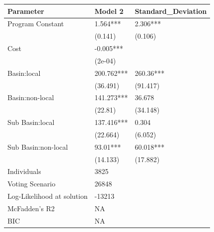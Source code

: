 \begin{table}[ht]
\centering
\begin{tabular}{lll}
  \hline
Parameter & Model 2 & Standard\_Deviation \\ 
  \hline
Program Constant & 1.564*** & 2.306*** \\ 
   & (0.141) & (0.106) \\ 
  Cost & -0.005*** &  \\ 
   & (2e-04) &  \\ 
  Basin:local & 200.762*** & 260.36*** \\ 
   & (36.491) & (91.417) \\ 
  Basin:non-local & 141.273*** & 36.678 \\ 
   & (22.81) & (34.148) \\ 
  Sub Basin:local & 137.416*** & 0.304 \\ 
   & (22.664) & (6.052) \\ 
  Sub Basin:non-local & 93.01*** & 60.018*** \\ 
   & (14.133) & (17.882) \\ 
  Individuals & 3825 &  \\ 
  Voting Scenario & 26848 &  \\ 
  Log-Likelihood at solution & -13213 &  \\ 
  McFadden’s R2 & NA &  \\ 
  BIC & NA &  \\ 
   \hline
\end{tabular}
\end{table}
